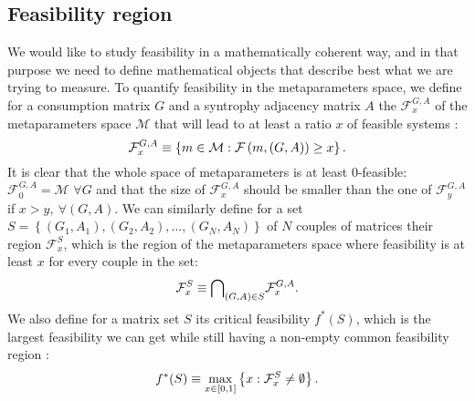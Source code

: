 \documentclass[12pt, titlepage]{report}
\begin{document}
\subsection{Feasibility region}\label{sec : methods feasibility volume}
We would like to study feasibility in a mathematically coherent way, and in that purpose we need to define mathematical objects that describe best what we are trying to measure. To quantify feasibility in the metaparameters space, we define for a consumption matrix $G$ and a syntrophy adjacency matrix $A$ the  $\mathcal{F}^{G,A}_x$ of the metaparameters space $\mathcal{M}$ that will lead to at least a ratio $x$ of feasible systems \ie :
\begin{equation}
\mathcal{F}^{G,A}_x \equiv \left\{m \in \mathcal{M} : \mathcal{F}\left(m, (G,A)\right)\geq x \right\}. \label{eq : x feasible volume}
\end{equation}
It is clear that the whole space of metaparameters is at least $0$-feasible: $\mathcal{F}^{G,A}_0 = \mathcal{M}$ $\forall G$ and that the size of $\mathcal{F}^{G,A}_{x}$ should be smaller than the one of $\mathcal{F}^{G,A}_{y}$ if $ x > y, \ \forall (G, A)$. We can similarly define for a set $S = \left\{ (G_1,A_1) , (G_2, A_2), \dots, (G_N, A_N)\right\}$ of $N$ couples of matrices their  region $\mathcal{F}^S_x$, which is the region of the metaparameters space where feasibility is at least $x$ for every couple in the set:
\begin{equation}
\mathcal{F}^S_x \equiv {\bigcap}_{(G,A) \in S} \mathcal{F}^{G,A}_x.
\end{equation}
We also define for a matrix set $S$ its critical feasibility $f^*(S)$, which is the largest feasibility we can get while still having a non-empty common feasibility region%
:
\begin{equation}
f^*(S) \equiv \max_{x \in \left[0,1\right]}\left\{ x : \mathcal{F}^S_x \neq \emptyset \right\}. \label{eq : feasibility methods critical common feasibility}
\end{equation}
%
\end{document}
